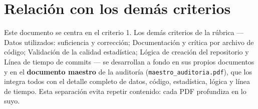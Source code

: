 \section{Relación con los demás criterios}

Este documento se centra en el criterio 1. Los demás criterios de la
rúbrica — Datos utilizados: suficiencia y corrección; Documentación y crítica por archivo de código; Validación de la calidad estadística; Lógica de creación del repositorio y Línea de tiempo de commits — se desarrollan a fondo en sus propios documentos
y en el \textbf{documento maestro} de la auditoría (\texttt{maestro\_auditoria.pdf}),
que los integra todos con el detalle completo de datos, código, estadística,
lógica y línea de tiempo. Esta separación evita repetir contenido: cada PDF
profundiza en lo suyo.

